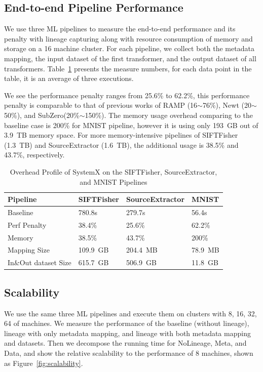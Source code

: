 \documentclass{sig-alternate}
\begin{document}
\subsection{End-to-end Pipeline Performance}
We use three ML pipelines to measure the end-to-end performance and its penalty with lineage capturing
along with resource consumption of memory and storage on a 16 machine cluster.
For each pipeline, we collect both the metadata mapping, the input dataset of the first transformer,  and the output dataset of all transformers.
Table~\ref{tb:apps-overhead} presents the measure numbers, for each data point in the table, it is an
average of three executions. 

We see the performance penalty ranges from 25.6\% to 62.2\%, this performance penalty is comparable to that
of previous works of RAMP (16$\sim$76\%), Newt (20$\sim$50\%), and SubZero(20\%$\sim$150\%).
The memory usage overhead comparing to the baseline case is 200\% for MNIST pipeline, however it is using only
193~GB out of 3.9~TB memory space. 
For more memory-intensive pipelines of SIFTFisher (1.3~TB) and SourceExtractor (1.6~TB), the additional usage is 38.5\% and 43.7\%, respectively.

\begin{table}[ht]
\begin{center}
    \caption{Overhead Profile of SystemX on the SIFTFisher, SourceExtractor, and MNIST Pipelines}
    \begin{scriptsize}
    \begin{tabular}{ | p{1.8cm} | p{1.8cm} | p{1.8cm} | p{1.5cm} | }
    \hline
    Pipeline & SIFTFisher & SourceExtractor & MNIST  \\ \hline \hline
    Baseline & 780.8s & 279.7s & 56.4s \\ \hline
    Perf Penalty & 38.4\% & 25.6\% & 62.2\%   \\ \hline
    Memory & 38.5\% & 43.7\% & 200\%\\ \hline
    Mapping Size & 109.9~GB & 204.4~MB & 78.9~MB \\ \hline
    In\&Out dataset Size & 615.7~GB & 506.9~GB & 11.8~GB\\ \hline
    \end{tabular}
    \end{scriptsize}
    \label{tb:apps-overhead}
\end{center}   
\end{table}

\subsection{Scalability}
We use the same three ML pipelines and execute them on clusters with {8, 16, 32, 64} of machines.
We measure the performance of the baseline (without lineage), lineage with only metadata mapping, 
and lineage with both metadata mapping and datasets. 
Then we decompose the running time for NoLineage, Meta, and Data, and show the relative scalability
 to the performance of 8 machines, shown as Figure~\ref{fig:scalability}.
\end{document}
